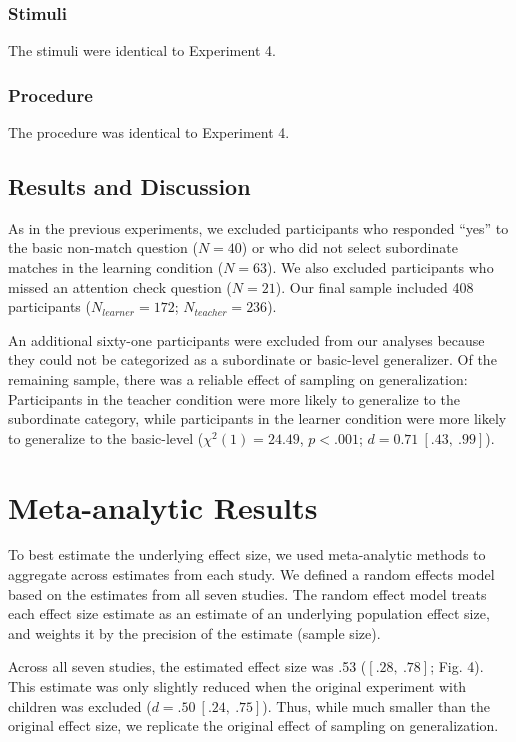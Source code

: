 \documentclass[man]{apa2}
\begin{document}
\subsubsection{Stimuli}
The stimuli were identical to Experiment 4.

\subsubsection{Procedure}
The procedure was identical to Experiment 4.

\subsection{Results and Discussion}

As in the previous experiments, we excluded participants who responded ``yes'' to the basic non-match question ($N=40$) or who did not select subordinate matches in the learning condition ($N = 63$). We also excluded participants who missed an attention check question ($N = 21$). Our final sample included 408 participants ($N_{learner} = 172$; $N_{teacher} = 236$).

An additional sixty-one participants were excluded from our analyses because they could not be categorized as a subordinate or basic-level generalizer. Of the remaining sample, there was a reliable effect of sampling on generalization: Participants in the teacher condition were more likely to generalize to the subordinate category, while participants in the learner condition were more likely to generalize to the basic-level ($\chi^2(1) = 24.49$, $p <.001$; $d = 0.71\ [.43,\ .99]$).

\section{Meta-analytic Results}
To best estimate the underlying effect size, we used meta-analytic methods to aggregate across estimates from each study. We defined a random effects model  based on the estimates from all seven studies\cite{Viechtbauer2010}. The random effect model treats each effect size estimate as an estimate of an underlying population effect size, and weights it by the precision of the estimate (sample size). 

Across all seven studies, the estimated effect size was .53 ($[.28,\ .78]$; Fig. 4). This estimate was only slightly reduced when the original experiment  with children was excluded  ($d = .50\ [.24,\ .75]$). Thus, while much smaller than the original effect size, we replicate the original effect of sampling on generalization.
\end{document}
